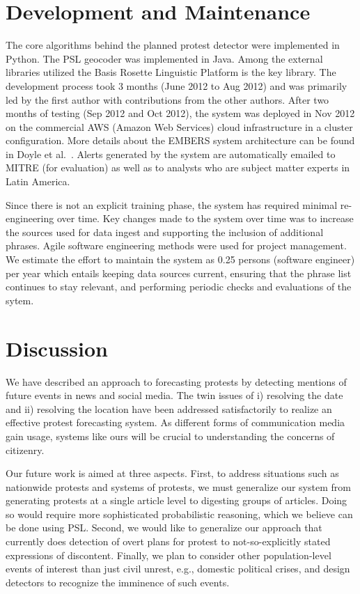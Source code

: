 \documentclass[letterpaper]{article}
\begin{document}
\section{Development and Maintenance}
The core algorithms behind the
planned protest detector were implemented in Python. The PSL geocoder was
implemented in Java. Among the external libraries utilized the Basis Rosette Linguistic Platform is the key
library. The development process took 3 months (June
2012 to Aug 2012) and was
primarily led by the first author with contributions from the other authors.
After two months of testing (Sep 2012 and Oct 2012), the system was deployed
in Nov 2012 on the commercial AWS (Amazon
Web Services) cloud infrastructure in a cluster configuration. 
More details about the EMBERS 
system architecture can be found in
Doyle et al.~. Alerts
generated by the system are automatically emailed to MITRE (for evaluation)
as well as to analysts who are subject matter experts in Latin America.

Since there is not an explicit training
phase, the system has required minimal re-engineering over time. Key changes
made to the system over time was to increase the sources used for data ingest
and supporting the inclusion of additional phrases. Agile software
engineering methods were used for project management. We estimate the
effort to maintain the system as 0.25 persons (software engineer) per year
which entails keeping data sources current, ensuring that
the phrase list continues to stay relevant, and performing periodic 
checks and evaluations of the sytem.

\section{Discussion}
We have described an approach to forecasting protests by detecting
mentions of future events in news and social media. The twin issues
of i) resolving the date and ii) resolving the location have been
addressed satisfactorily to realize an effective protest forecasting
system. As different forms of communication media gain usage, systems
like ours will be crucial to understanding the concerns of citizenry.

Our future work is aimed at three aspects. First, to address situations
such as nationwide protests and systems of protests, we must generalize
our system from generating protests at a single article level to
digesting groups of articles. Doing so would require more sophisticated
probabilistic reasoning, which we believe can be done using PSL.
Second, we would like to generalize our
approach that currently does detection of overt plans for protest to
not-so-explicitly stated expressions of discontent.  Finally, we plan to
consider other population-level events of interest than just civil
unrest, e.g., domestic political crises, and design detectors to
recognize the imminence of such events.
\end{document}
